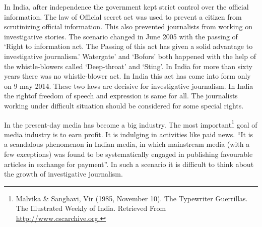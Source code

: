 \begin{multicols}{2}

\noi
In India, after independence the government kept strict control over the official information.
The law of Official secret act was used to prevent a citizen from scrutinizing official
information. This also prevented journalists from working on investigative stories. The
scenario changed in June 2005 with the passing of ‘Right to information act. The Passing of
this act has given a solid advantage to investigative journalism.’ Watergate’ and ‘Bofors’ both
happened with the help of the whistle-blowers called ‘Deep-throat’ and ‘Sting’. In India for
more than sixty years there was no whistle-blower act. In India this act has come into form only
on 9 may 2014. These two laws are decisive for investigative journalism. In India the rightof
freedom of speech and expression is same for all. The journalists working under difficult
situation should be considered for some special rights.

\vspace{-.15cm}


\vspace{-.1cm}

\noi
In the present-day media has become a big industry. The most important\footnote{Malvika \& Sanghavi, Vir (1985, November 10). The Typewriter Guerrillas. The Illustrated Weekly of India. Retrieved From \url{http://www.cscarchive.org.}} goal of media industry is to earn profit. It is indulging in activities like paid news. “It is a scandalous phenomenon in Indian media, in which mainstream media (with a few exceptions) was found to be systematically engaged in publishing favourable articles in exchange for payment”. In such a scenario it is difficult to think about the growth of investigative journalism.

\vspace{-.15cm}


\vspace{-.1cm}


\end{multicols}
